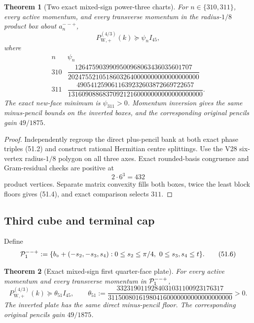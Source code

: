 \documentclass[11pt,oneside]{article}
\newtheorem{theorem}{Theorem}[section]
\theoremstyle{definition}
\theoremstyle{remark}
\begin{document}
\begin{theorem}[Two exact mixed-sign power-three charts]
\label{thm:newv51-two-charts}
For \(n\in\{310,311\}\), every active momentum, and every transverse
momentum in the radius-\(1/8\) product box about \(a_n^{--+}\),
\[
 P_{\mathrm W,+}^{(4/3)}(k)\succeq\psi_n I_{45},      \tag{51.3}
\]
where
\[
\begin{array}{c|c}
n&\psi_n\\ \hline
310&\dfrac{1264759039909500968063436035601707}
{20247552105186032640000000000000000000}\\[5pt]
311&\dfrac{4905412590611639232603872669722657}
{131609088683709212160000000000000000000}.
\end{array}                                             \tag{51.4}
\]
The exact new-face minimum is \(\psi_{311}>0\).  Momentum inversion
gives the same minus-pencil bounds on the inverted boxes, and the
corresponding original pencils gain \(49/1875\).
\end{theorem}

\begin{proof}
Independently regroup the direct plus-pencil bank at both exact
phase triples (51.2) and construct rational Hermitian centre
splittings.  Use the V28 six-vertex radius-\(1/8\) polygon on all
three axes.  Exact rounded-basis congruence and Gram-residual checks
are positive at
\[
 2\cdot6^3=432                                         \tag{51.5}
\]
product vertices.  Separate matrix convexity fills both boxes,
twice the least block floors gives (51.4), and exact comparison
selects \(311\).
\end{proof}

\subsection{Third cube and terminal cap}

Define
\[
 {\cal P}_{1}^{--+}:=
 \{b_\circ+(-s_2,-s_3,s_4):
 0\le s_2\le\pi/4,\ 0\le s_3,s_4\le t\}.              \tag{51.6}
\]

\begin{theorem}[Exact mixed-sign first quarter-face plate]
\label{thm:newv51-mixed-plate}
For every active momentum and every transverse momentum in
\({\cal P}_{1}^{--+}\),
\[
 P_{\mathrm W,+}^{(4/3)}(k)
 \succeq\theta_{51}I_{45},\qquad
 \theta_{51}:=
 \frac{3323190119284031031100923176317}
 {311500801619804160000000000000000000}>0.             \tag{51.7}
\]
The inverted plate has the same direct minus-pencil floor.  The
corresponding original pencils gain \(49/1875\).
\end{theorem}
\end{document}
